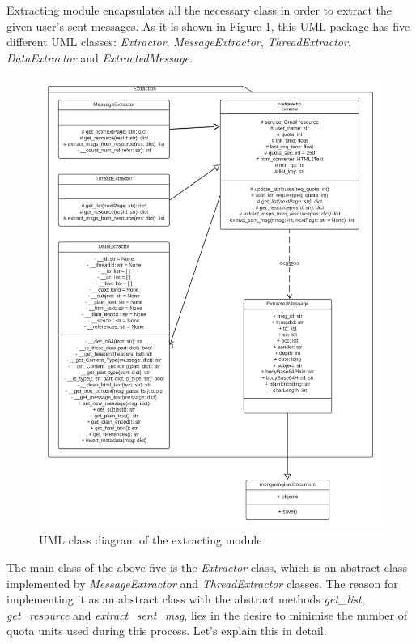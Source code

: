 Extracting module encapsulates all the necessary class in order to extract the given user's sent messages. As it is shown in Figure \ref{fig:umlext}, this UML package has five different UML classes: \textit{Extractor}, \textit{MessageExtractor}, \textit{ThreadExtractor}, \textit{DataExtractor} and \textit{ExtractedMessage}.

\begin{figure}[p]
	\centering%
	\centerline{\includegraphics[width=0.9\paperwidth]{Imagenes/Bitmap/extractionUML.png}}%
	\caption{UML class diagram of the extracting module}%
	\label{fig:umlext}
\end{figure}


The main class of the above five is the \textit{Extractor} class, which is an abstract class implemented by \textit{MessageExtractor} and \textit{ThreadExtractor} classes. The reason for implementing it as an abstract class with the abstract methods \textit{get\_list}, \textit{get\_resource} and \textit{extract\_sent\_msg}, lies in the desire to minimise the number of quota units used during this process. Let's explain this in detail.

